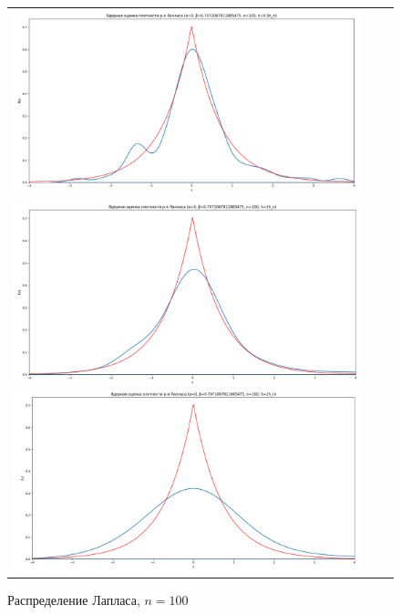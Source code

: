 \begin{figure}[H]
	\begin{tabular}{ccc}
		\includegraphics[scale=0.14]{resources/4_laplace_100_half.png}
		\includegraphics[scale=0.14]{resources/4_laplace_100_one.png}
		\includegraphics[scale=0.14]{resources/4_laplace_100_two.png}
	\end{tabular}
	\caption{Распределение Лапласа, $n=100$}
\end{figure}

